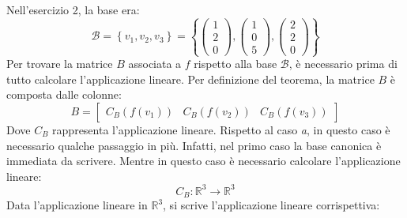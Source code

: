 \documentclass[a4paper]{article}
\begin{document}
	\noindent
	Nell'esercizio 2, la base era:
	\begin{equation*}
		\mathcal{B} = \left\{v_{1}, v_{2}, v_{3}\right\} = \left\{
		\begin{pmatrix}
			1 \\
			2 \\
			0
		\end{pmatrix},
		\begin{pmatrix}
			1 \\
			0 \\
			5
		\end{pmatrix},
		\begin{pmatrix}
			2 \\
			2 \\
			0
		\end{pmatrix}
		\right\}
	\end{equation*}
	Per trovare la matrice $B$ associata a $f$ rispetto alla base $\mathcal{B}$, è necessario prima di tutto calcolare l'applicazione lineare. Per definizione del teorema, la matrice $B$ è composta dalle colonne:
	\begin{equation*}
		B = \begin{bmatrix}
			C_{B}\left(f\left(v_{1}\right)\right) & C_{B}\left(f\left(v_{2}\right)\right) & C_{B}\left(f\left(v_{3}\right)\right)
		\end{bmatrix}
	\end{equation*}
	Dove $C_{B}$ rappresenta l'applicazione lineare. Rispetto al caso \emph{a}, in questo caso è necessario qualche passaggio in più. Infatti, nel primo caso la base canonica è immediata da scrivere. Mentre in questo caso è necessario calcolare l'applicazione lineare:
	\begin{equation*}
		C_{B} : \mathbb{R}^{3} \longrightarrow \mathbb{R}^{3}
	\end{equation*}
	Data l'applicazione lineare in $\mathbb{R}^{3}$, si scrive l'applicazione lineare corrispettiva:
\end{document}
